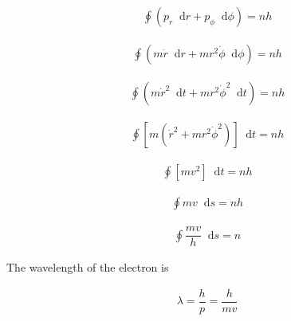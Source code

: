 \documentclass{article}
\newcommand*{\md}{\mathop{}\!\mathrm{d}}
\begin{document}
\begin{equation*}
  \begin{aligned}
    \oint \left( p_r \md r + p_{\phi} \md \phi \right) = n h
  \end{aligned}
\end{equation*}

\begin{equation*}
  \begin{aligned}
    \oint \left( m \dot{r} \md r + m r^2 \dot{\phi} \md \phi \right) = n h
  \end{aligned}
\end{equation*}

\begin{equation*}
  \begin{aligned}
    \oint \left( m \dot{r}^2 \md t + m r^2 \dot{\phi}^2 \md t \right) = n h
  \end{aligned}
\end{equation*}

\begin{equation*}
  \begin{aligned}
    \oint \left[ m \left( \dot{r}^2 + m r^2 \dot{\phi}^2 \right) \right] \md t = n h
  \end{aligned}
\end{equation*}

\begin{equation*}
  \begin{aligned}
    \oint \left[ m v^2 \right] \md t = n h
  \end{aligned}
\end{equation*}

\begin{equation*}
  \begin{aligned}
    \oint m v \md s = n h
  \end{aligned}
\end{equation*}

\begin{equation*}
  \begin{aligned}
    \oint \dfrac{m v}{h}  \md s = n
  \end{aligned}
\end{equation*}

The wavelength of the electron is

\begin{equation*}
  \begin{aligned}
    \lambda = \dfrac{h}{p} = \dfrac{h}{m v}  
  \end{aligned}
\end{equation*}
\end{document}
